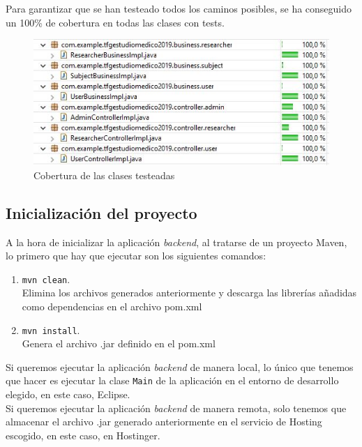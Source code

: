         Para garantizar que se han testeado todos los caminos posibles, se ha conseguido un 100\% de cobertura en todas las clases con tests.
        \newline
        
        
          \begin{figure}[h]
            \centering
            \includegraphics[width=1\textwidth]{images/coberturatests.JPG}
            \caption{Cobertura de las clases testeadas}
        \end{figure}
        \FloatBarrier
        

        
        
    \subsection{Inicialización del proyecto}
        A la hora de inicializar la aplicación \textit{backend}, al tratarse de un proyecto  Maven, lo primero que hay que ejecutar son los siguientes comandos: 
        
        \begin{enumerate}
          \item\texttt{mvn clean}.\\
          Elimina los archivos generados anteriormente y descarga las librerías añadidas como dependencias en el archivo pom.xml
          \item\texttt{mvn install}. \\
          Genera el archivo .jar definido en el pom.xml
        \end{enumerate}
        
        Si queremos ejecutar la aplicación \textit{backend} de manera local, lo único que tenemos que hacer es ejecutar la clase \texttt{Main} de la aplicación en el entorno de desarrollo elegido, en este caso, Eclipse. \\
        \newline
        Si queremos ejecutar la aplicación \textit{backend} de manera remota, solo tenemos que almacenar el archivo .jar generado anteriormente en el servicio de Hosting escogido, en este caso, en Hostinger\cite{hostinger}.
        
        
        
        
    